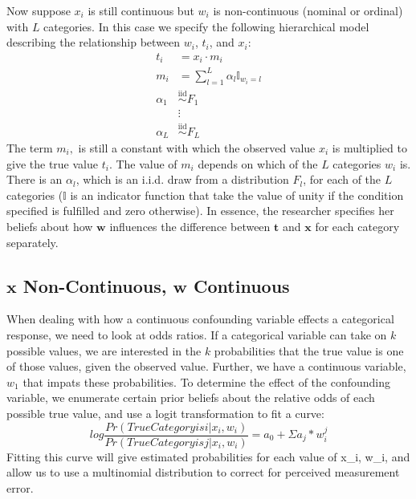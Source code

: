 \documentclass[fignum,letterpaper,12pt]{article}
\newcommand{\iid}{\stackrel{\mathrm{iid}}{\sim}}
\begin{document}
Now suppose $x_i$ is still continuous but $w_i$ is non-continuous (nominal or ordinal) with $L$ categories. In this case we specify the following hierarchical model describing the relationship between $w_i$, $t_i$, and $x_i$:
\begin{equation}
\begin{array}{rl}
t_i & = x_i \cdot m_i \\
m_{i} & = \sum_{l=1}^{L} \alpha_l \mathbb{I}_{w_i=l} \\
\alpha_1 & \iid F_1\\
& \vdots \\
\alpha_L & \iid F_L
\end{array}
\end{equation}
The term $m_i,$ is still a constant with which the observed value $x_i$ is multiplied to give the true value $t_i$. The value of $m_i$ depends on which of the $L$ categories $w_i$ is. There is an $\alpha_l$, which is an i.i.d. draw from a distribution $F_l$, for each of the $L$ categories ($\mathbb{I}$ is an indicator function that take the value of unity if the condition specified is fulfilled and zero otherwise). In essence, the researcher specifies her beliefs about how $\mathbf{w}$ influences the difference between $\mathbf{t}$ and $\mathbf{x}$ for each category separately.


\subsection{$\mathbf{x}$ Non-Continuous, $\mathbf{w}$ Continuous} \label{subsec:case3}
When dealing with how a continuous confounding variable effects a categorical response, we need to look at odds ratios. If a categorical variable can take on $k$ possible values, we are interested in the $k$ probabilities that the true value is one of those values, given the observed value. Further, we have a continuous variable, $w_1$ that impats these probabilities. To determine the effect of the confounding variable, we enumerate certain prior beliefs about the relative odds of each possible true value, and use a logit transformation to fit a curve:
\begin{equation}
log\frac{Pr(True Category is i|x_i,w_i)}{Pr(True Category is j|x_i,w_i)}=a_0+\Sigma a_j*w_i^j
\end{equation}
Fitting this curve will give estimated probabilities for each value of x_i, w_i, and allow us to use a multinomial distribution to correct for perceived measurement error.
\end{document}
